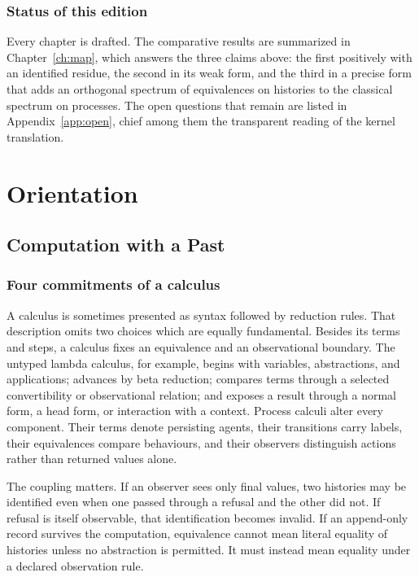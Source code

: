 \documentclass[11pt,openany]{book}
\theoremstyle{remark}
\begin{document}
\section*{Status of this edition}

Every chapter is drafted. The comparative results are summarized in
Chapter~\ref{ch:map}, which answers the three claims above: the first
positively with an identified residue, the second in its weak form, and
the third in a precise form that adds an orthogonal spectrum of
equivalences on histories to the classical spectrum on processes. The
open questions that remain are listed in Appendix~\ref{app:open}, chief
among them the transparent reading of the kernel translation.

\mainmatter
\part{Orientation}

\chapter{Computation with a Past}
\label{ch:past}

\section{Four commitments of a calculus}

A calculus is sometimes presented as syntax followed by reduction rules.
That description omits two choices which are equally fundamental. Besides
its terms and steps, a calculus fixes an equivalence and an observational
boundary. The untyped lambda calculus, for example, begins with variables,
abstractions, and applications; advances by beta reduction; compares terms
through a selected convertibility or observational relation; and exposes a
result through a normal form, a head form, or interaction with a context.
Process calculi alter every component. Their terms denote persisting
agents, their transitions carry labels, their equivalences compare
behaviours, and their observers distinguish actions rather than returned
values alone.

The coupling matters. If an observer sees only final values, two histories
may be identified even when one passed through a refusal and the other did
not. If refusal is itself observable, that identification becomes invalid.
If an append-only record survives the computation, equivalence cannot mean
literal equality of histories unless no abstraction is permitted. It must
instead mean equality under a declared observation rule.
\end{document}
